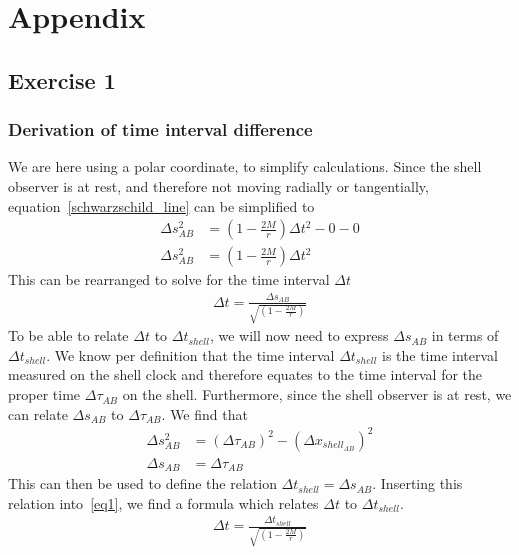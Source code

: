 \documentclass[reprint,english,notitlepage]{revtex4-2}
\begin{document}
\section{Appendix}\label{sec:appendix}
    \subsection{Exercise 1}\label{subsec:exercise-1}
        \subsubsection{Derivation of time interval difference}\label{subsec:derivation-of-time-interval-difference}
            We are here using a polar coordinate, to simplify calculations.
            Since the shell observer is at rest, and therefore not moving radially or tangentially, equation~\eqref{schwarzschild_line} can be simplified to
            \begin{align}
                \Delta s^2_{AB} &= \left(1-\frac{2M}{r}\right) \Delta t^2 - 0 - 0\\
                \Delta s^2_{AB} &= \left(1-\frac{2M}{r}\right) \Delta t^2
            \end{align}
            This can be rearranged to solve for the time interval $\Delta t$
            \begin{align}
                \Delta t = \frac{\Delta s_{AB}}{\sqrt{\left(1-\frac{2M}{r}\right)}} \label{eq1}
            \end{align}
            To be able to relate $\Delta t$ to $\Delta t_{shell}$, we will now need to express $\Delta s_{AB}$ in terms of $\Delta t_{shell}$.
            We know per definition that the time interval $\Delta t_{shell}$ is the time interval measured on the shell clock and therefore equates to the time interval for the proper time $\Delta \tau_{AB}$ on the shell.
            Furthermore, since the shell observer is at rest, we can relate $\Delta s_{AB}$ to $\Delta \tau_{AB}$.
            We find that
            \begin{align}
                \Delta s^2_{AB} &= (\Delta \tau_{AB})^2 - (\Delta x_{shell}_{AB})^2\\
                \Delta s_{AB} &= \Delta \tau_{AB}
            \end{align}
            This can then be used to define the relation $\Delta t_{shell} = \Delta s_{AB}$.
            Inserting this relation into~\eqref{eq1}, we find a formula which relates $\Delta t$ to $\Delta t_{shell}$.
            \begin{align}
                \Delta t = \frac{\Delta t_{shell}}{\sqrt{\left(1-\frac{2M}{r}\right)}}
            \end{align}
\end{document}
